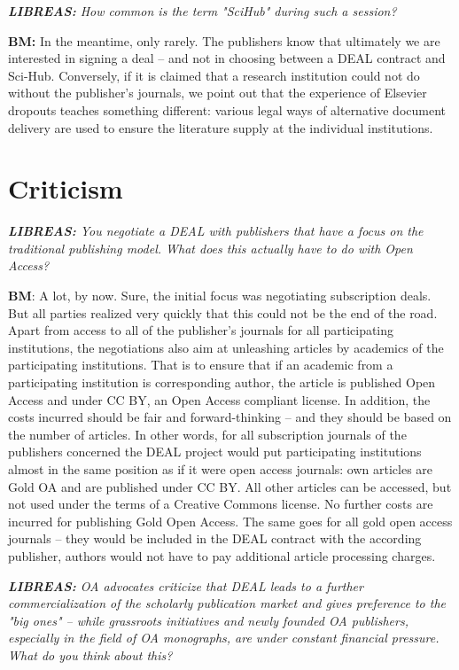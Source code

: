 \documentclass[a4paper,
fontsize=11pt,
oneside,
numbers=noperiodatend,
parskip=half-,
bibliography=totoc,
final
]{scrartcl}
\begin{document}
\emph{\textbf{LIBREAS:} How common is the term "SciHub" during such a
session?}

\textbf{BM:} In the meantime, only rarely. The publishers know that
ultimately we are interested in signing a deal -- and not in choosing
between a DEAL contract and Sci-Hub. Conversely, if it is claimed that a
research institution could not do without the publisher's journals, we
point out that the experience of Elsevier dropouts teaches something
different: various legal ways of alternative document delivery are used
to ensure the literature supply at the individual institutions.

\hypertarget{criticism}{%
\section*{Criticism}\label{criticism}}

\emph{\textbf{LIBREAS:} You negotiate a DEAL with publishers that have a
focus on the traditional publishing model. What does this actually have
to do with Open Access? }

\textbf{BM}: A lot, by now. Sure, the initial focus was negotiating
subscription deals. But all parties realized very quickly that this
could not be the end of the road. Apart from access to all of the
publisher's journals for all participating institutions, the
negotiations also aim at unleashing articles by academics of the
participating institutions. That is to ensure that if an academic from a
participating institution is corresponding author, the article is
published Open Access and under CC BY, an Open Access compliant license.
In addition, the costs incurred should be fair and forward-thinking --
and they should be based on the number of articles. In other words, for
all subscription journals of the publishers concerned the DEAL project
would put participating institutions almost in the same position as if
it were open access journals: own articles are Gold OA and are published
under CC BY. All other articles can be accessed, but not used under the
terms of a Creative Commons license. No further costs are incurred for
publishing Gold Open Access. The same goes for all gold open access
journals -- they would be included in the DEAL contract with the
according publisher, authors would not have to pay additional article
processing charges.

\emph{\textbf{LIBREAS:} OA advocates criticize that DEAL leads to a
further commercialization of the scholarly publication market and gives
preference to the "big ones" -- while grassroots initiatives and newly
founded OA publishers, especially in the field of OA monographs, are
under constant financial pressure. What do you think about this?}
\end{document}

